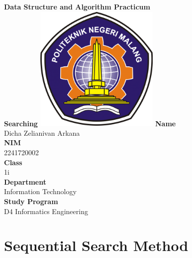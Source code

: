\documentclass[12pt,titlepage]{article}
\newcommand{\vSubject}{Data Structure and Algorithm Practicum}
\newcommand{\vSubtitle}{Searching}
\newcommand{\vName}{Dicha Zelianivan Arkana}
\newcommand{\vNIM}{2241720002}
\newcommand{\vClass}{1i}
\newcommand{\vDepartment}{Information Technology}
\newcommand{\vStudyProgram}{D4 Informatics Engineering}
\begin{document}
\begin{titlepage}
    \centering
    \vfill
    {\bfseries\LARGE
        \vSubject\\
        \vskip0.25cm
        \vSubtitle
    }
    \vfill
    \includegraphics[width=6cm]{images/polinema-logo.png}
    \vfill
    {
        \textbf{Name}\\
        \vName\\
        \vskip0.5cm
        \textbf{NIM}\\
        \vNIM\\
        \vskip0.5cm
        \textbf{Class}\\
        \vClass\\
        \vskip0.5cm
        \textbf{Department}\\
        \vDepartment\\
        \vskip0.5cm
        \textbf{Study Program}\\
        \vStudyProgram
    }
\end{titlepage}

\section{Sequential Search Method}
\end{document}
